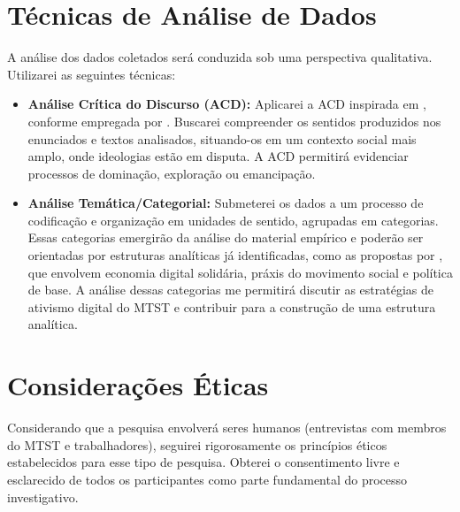 \section{Técnicas de Análise de Dados}

A análise dos dados coletados será conduzida sob uma perspectiva qualitativa. Utilizarei as seguintes técnicas:

\begin{itemize}
    \item \textbf{Análise Crítica do Discurso (ACD):} Aplicarei a ACD inspirada em , conforme empregada por . Buscarei compreender os sentidos produzidos nos enunciados e textos analisados, situando-os em um contexto social mais amplo, onde ideologias estão em disputa. A ACD permitirá evidenciar processos de dominação, exploração ou emancipação.

    \item \textbf{Análise Temática/Categorial:} Submeterei os dados a um processo de codificação e organização em unidades de sentido, agrupadas em categorias. Essas categorias emergirão da análise do material empírico e poderão ser orientadas por estruturas analíticas já identificadas, como as propostas por , que envolvem economia digital solidária, práxis do movimento social e política de base. A análise dessas categorias me permitirá discutir as estratégias de ativismo digital do MTST e contribuir para a construção de uma estrutura analítica.
\end{itemize}

\section{Considerações Éticas}

Considerando que a pesquisa envolverá seres humanos (entrevistas com membros do MTST e trabalhadores), seguirei rigorosamente os princípios éticos estabelecidos para esse tipo de pesquisa. Obterei o consentimento livre e esclarecido de todos os participantes como parte fundamental do processo investigativo.



